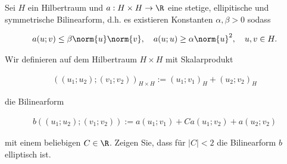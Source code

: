 
\begin{exercise}

Sei $H$ ein Hilbertraum und $a: H \times H \rightarrow \R$ eine stetige, ellipitische und symmetrische Bilinearform, d.h. es existieren Konstanten $\alpha, \beta > 0$ sodass

\begin{align*}
  a(u; v)
  \leq
  \beta \norm{u}\norm{v},
  \quad
  a(u; u) \geq \alpha \norm{u}^2,
  \quad
  u, v \in H.
\end{align*}

Wir definieren auf dem Hilbertraum $H \times H$ mit Skalarprodukt

\begin{align*}
  (
    (u_1; u_2);
    (v_1; v_2)
  )_{
    H \times H
  }
  :=
  (u_1; v_1)_H
  +
  (u_2; v_2)_H
\end{align*}

die Bilinearform

\begin{align*}
  b
  (
    (u_1; u_2);
    (v_1; v_2)
  )
  :=
  a(u_1; v_1)
  +
  C a(u_1; v_2)
  +
  a(u_2;v_2)
\end{align*}

mit einem beliebigen $C \in \R$. Zeigen Sie, dass für $|C| < 2$ die Bilinearform $b$ elliptisch ist.

\end{exercise}


